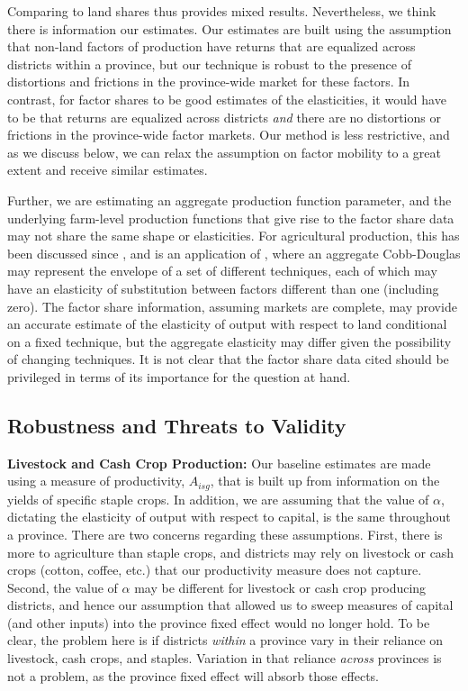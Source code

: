 \documentclass[11pt]{article}
\begin{document}
Comparing to land shares thus provides mixed results. Nevertheless, we think there is information our estimates. Our estimates are built using the assumption that non-land factors of production have returns that are equalized across districts within a province, but our technique is robust to the presence of distortions and frictions in the province-wide market for these factors. In contrast, for factor shares to be good estimates of the elasticities, it would have to be that returns are equalized across districts \textit{and} there are no distortions or frictions in the province-wide factor markets. Our method is less restrictive, and as we discuss below, we can relax the assumption on factor mobility to a great extent and receive similar estimates. 

Further, we are estimating an aggregate production function parameter, and the underlying farm-level production functions that give rise to the factor share data may not share the same shape or elasticities. For agricultural production, this has been discussed since \citet{Hayami:1970ly}, and is an application of \citet{houthakker1955}, where an aggregate Cobb-Douglas may represent the envelope of a set of different techniques, each of which may have an elasticity of substitution between factors different than one (including zero). The factor share information, assuming markets are complete, may provide an accurate estimate of the elasticity of output with respect to land conditional on a fixed technique, but the aggregate elasticity may differ given the possibility of changing techniques. It is not clear that the factor share data cited should be privileged in terms of its importance for the question at hand.

\subsection{Robustness and Threats to Validity}
\textbf{Livestock and Cash Crop Production:} Our baseline estimates are made using a measure of productivity, $A_{isg}$, that is built up from information on the yields of specific staple crops. In addition, we are assuming that the value of $\alpha$, dictating the elasticity of output with respect to capital, is the same throughout a province. There are two concerns regarding these assumptions. First, there is more to agriculture than staple crops, and districts may rely on livestock or cash crops (cotton, coffee, etc.) that our productivity measure does not capture. Second, the value of $\alpha$ may be different for livestock or cash crop producing districts, and hence our assumption that allowed us to sweep measures of capital (and other inputs) into the province fixed effect would no longer hold. To be clear, the problem here is if districts \textit{within} a province vary in their reliance on livestock, cash crops, and staples. Variation in that reliance \textit{across} provinces is not a problem, as the province fixed effect will absorb those effects.
\end{document}

